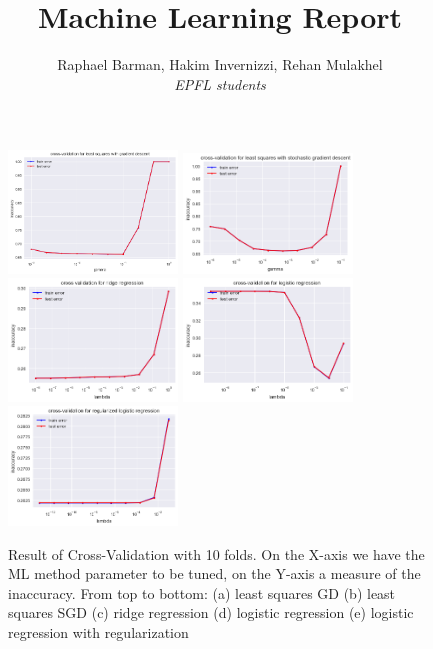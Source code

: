 \documentclass[10pt,conference,compsocconf]{IEEEtran}
\begin{document}
\title{Machine Learning Report}

\author{
  Raphael Barman, Hakim Invernizzi, Rehan Mulakhel\\
  \textit{EPFL students}
}

\maketitle

\begin{figure}
\begin{center}
\includegraphics[width=4.5cm]{cross_validation_least_squares_GD.png}
\includegraphics[width=4.5cm]{cross_validation_least_squares_SGD.png}
\includegraphics[width=4.5cm]{cross_validation_ridge_regression.png}
\includegraphics[width=4.5cm]{cross_validation_logistic_regression.png}
\includegraphics[width=4.5cm]{cross_validation_reg_logistic_regression.png}
 \end{center}
 \begin{center}
 \caption{\label{fig:figure1}Result of Cross-Validation with 10 folds. On the
   X-axis we have the ML method parameter to be tuned, on the Y-axis a measure
   of the inaccuracy. From top to bottom: (a) least squares GD (b) least squares
   SGD (c) ridge regression (d) logistic regression (e) logistic regression with
   regularization}
 \end{center}
\end{figure}
\end{document}

